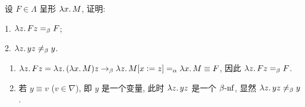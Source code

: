 \begin{problem}
设 $F \in \Lambda$ 呈形 $\lambda {x}.\,{M}$, 证明:

1. $\lambda {z}.\,{Fz} =_\beta F$;

2. $\lambda {z}.\,{yz} \neq_\beta y$.
\end{problem}

\begin{solution}
\begin{enumerate}
\item $\lambda {z}.\,{Fz} = \lambda {z}.\,{(\lambda {x}.\,{M})z} \to_\beta \lambda {z}.\,{M[x:=z]} =_\alpha \lambda {x}.\,{M} \equiv F$, 因此 $\lambda {z}.\,{Fz} =_\beta F$.
\item 若 $y \equiv v$ ($v \in \nabla$), 即 $y$ 是一个变量, 此时 $\lambda {z}.\,{yz}$ 是一个 $\beta\text{-nf}$, 显然 $\lambda {z}.\,{yz} \neq_\beta y$.
\end{enumerate}
\end{solution}
